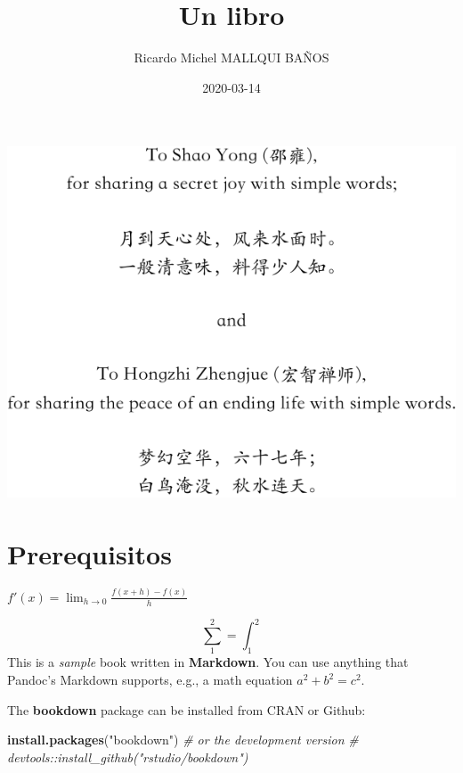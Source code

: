 \documentclass[]{krantz}
\title{Un libro}
\author{Ricardo Michel MALLQUI BAÑOS}
\date{2020-03-14}
\makeatletter
\newenvironment{Shaded}{\begin{snugshade}}{\end{snugshade}}
\newcommand{\CommentTok}[1]{\textcolor[rgb]{0.37,0.37,0.37}{\textit{#1}}}
\newcommand{\KeywordTok}[1]{\textcolor[rgb]{0.27,0.27,0.27}{\textbf{#1}}}
\newcommand{\NormalTok}[1]{#1}
\newcommand{\StringTok}[1]{\textcolor[rgb]{0.5,0.5,0.5}{#1}}
\renewcommand*{\cleardoublepage}{\clearpage\if@twoside \ifodd\c@page\else
	\hbox{}%
	\thispagestyle{empty}%
	\newpage%
	\if@twocolumn\hbox{}\newpage\fi\fi\fi}
\makeatother
\begin{document}
\maketitle

\thispagestyle{empty}
\begin{center}
\includegraphics{dedication.pdf}
\end{center}


{
\setcounter{tocdepth}{1}
\tableofcontents
}
\hypertarget{prerequisitos}{%
\chapter*{Prerequisitos}\label{prerequisitos}}

\(f'(x)=\lim _{h\to 0}\frac{f(x+h)-f(x)}{h}\)

\[\sum_1^2=\int_1^2\]
This is a \emph{sample} book written in \textbf{Markdown}. You can use anything that Pandoc's Markdown supports, e.g., a math equation \(a^2 + b^2 = c^2\).

The \textbf{bookdown} package can be installed from CRAN or Github:

\begin{Shaded}
\begin{Highlighting}[]
\KeywordTok{install.packages}\NormalTok{(}\StringTok{"bookdown"}\NormalTok{)}
\CommentTok{# or the development version}
\CommentTok{# devtools::install_github("rstudio/bookdown")}
\end{Highlighting}
\end{Shaded}
\end{document}
